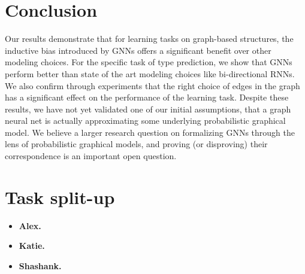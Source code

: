 \section{Conclusion}
\label{sec:conclusions}

Our results demonstrate that for learning tasks on graph-based structures, the inductive bias introduced by GNNs offers a significant benefit over other modeling choices.
For the specific task of type prediction, we show that GNNs perform better than state of the art modeling choices like bi-directional RNNs.
We also confirm through experiments that the right choice of edges in the graph has a significant effect on the performance of the learning task.
Despite these results, we have not yet validated one of our initial assumptions, that a graph neural net is actually approximating some underlying probabilistic graphical model.
We believe a larger research question on formalizing GNNs through the lens of probabilistic graphical models, and proving (or disproving) their correspondence is an important open question.

\section{Task split-up}
\begin{itemize}[]
	\item \textbf{Alex.}
	\item \textbf{Katie.}
	\item \textbf{Shashank.}
\end{itemize}
